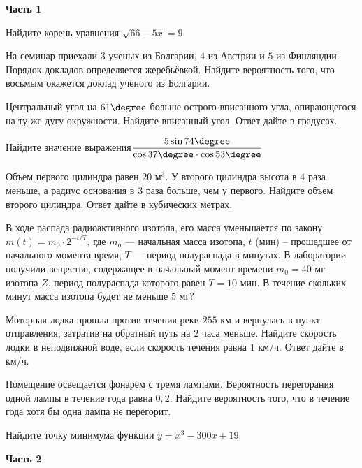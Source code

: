 \begin{center}
	\textbf{Часть 1}
\end{center}
\begin{listofex}
	\item Найдите корень уравнения \( \sqrt{66-5x}=9 \)
	\item На семинар приехали \( 3 \) ученых из Болгарии, \( 4 \) из Австрии и
	\( 5 \) из Финляндии. Порядок докладов определяется жеребьёвкой.
	Найдите вероятность того, что восьмым окажется доклад ученого
	из Болгарии.
	\item Центральный угол на \( 61\degree \) больше
	острого вписанного угла, опирающегося на ту
	же дугу окружности. Найдите вписанный угол.
	Ответ дайте в градусах.
	\item Найдите значение выражения\quad\( \dfrac{5\sin74\degree}{\cos37\degree\cdot\cos53\degree} \)
	\item Объем первого цилиндра равен \( 20 \) м\( ^3 \). У второго цилиндра
	высота в \( 4 \) раза меньше, а радиус основания в \( 3 \) раза больше,
	чем у первого. Найдите объем второго цилиндра. Ответ дайте в
	кубических метрах.
	\item {}
	\item В ходе распада радиоактивного изотопа, его масса уменьшается по закону \( m(t)=m_0\cdot2^{-t/T} \), где \( m_o \) --- начальная масса изотопа, \( t \) (мин) -- прошедшее от начального момента время, \( T \) --- период полураспада в минутах. В лаборатории получили вещество, содержащее в начальный момент времени \( m_0=40 \) мг изотопа \( Z \), период полураспада которого равен \( T=10 \) мин. В течение скольких минут масса изотопа будет не меньше \( 5 \) мг?
	\item Моторная лодка прошла против течения реки \( 255 \) км и
	вернулась в пункт отправления, затратив на обратный путь на \( 2 \) часа меньше. Найдите скорость лодки в неподвижной воде, если скорость течения равна \( 1 \) км/ч. Ответ дайте в км/ч.
	\item {}
	\item Помещение освещается фонарём с тремя лампами.
	Вероятность перегорания одной лампы в течение года равна \( 0,2 \).
	Найдите вероятность того, что в течение года хотя бы одна лампа
	не перегорит.
	\item Найдите точку минимума функции \( y=x^3-300x+19 \).
\end{listofex}
	\begin{center}
		\textbf{Часть 2}
	\end{center}
